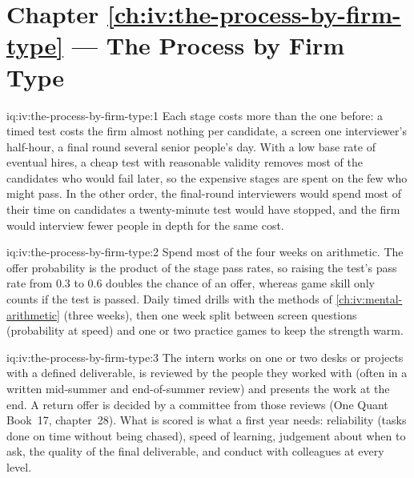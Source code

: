 \section*{Chapter \ref{ch:iv:the-process-by-firm-type} --- The Process by Firm Type}

\begin{solution}{iq:iv:the-process-by-firm-type:1}
Each stage costs more than the one before: a timed test costs the firm almost nothing per candidate, a screen
one interviewer's half-hour, a final round several senior people's day. With a low base rate of eventual
hires, a cheap test with reasonable validity removes most of the candidates who would fail later, so the
expensive stages are spent on the few who might pass. In the other order, the final-round interviewers would
spend most of their time on candidates a twenty-minute test would have stopped, and the firm would interview
fewer people in depth for the same cost.
\end{solution}

\begin{solution}{iq:iv:the-process-by-firm-type:2}
Spend most of the four weeks on arithmetic. The offer probability is the product of the stage pass rates, so
raising the test's pass rate from 0.3 to 0.6 doubles the chance of an offer, whereas game skill only counts if
the test is passed. Daily timed drills with the methods of \cref{ch:iv:mental-arithmetic} (three weeks),
then one week split between screen questions (probability at speed) and one or two practice games to keep the
strength warm.
\end{solution}

\begin{solution}{iq:iv:the-process-by-firm-type:3}
The intern works on one or two desks or projects with a defined deliverable, is reviewed by the people they
worked with (often in a written mid-summer and end-of-summer review) and presents the work at the end. A
return offer is decided by a committee from those reviews (One Quant Book~17, chapter~28). What is scored is
what a first year needs: reliability (tasks done on time without being chased), speed of learning, judgement
about when to ask, the quality of the final deliverable, and conduct with colleagues at every level.
\end{solution}

